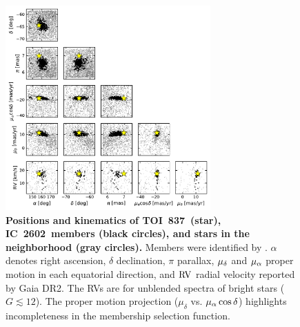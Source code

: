 \documentclass[12pt,twocolumn,tighten]{aastex63}
\newcommand{\tn}{TOI~837} %
\newcommand{\cn}{IC~2602} %
\begin{document}
\begin{figure}[!t]
	\begin{center}
		\leavevmode
		\includegraphics[width=0.7\textwidth]{f8.pdf}
	\end{center}
	\vspace{-0.7cm}
	\caption{ 
  {\bf Positions and kinematics of \tn\ (star), \cn\ members (black
  circles), and stars in the neighborhood (gray circles).} Members
  were identified by \citet{cantatgaudin_gaia_2018}.  $\alpha$ denotes
  right ascension, $\delta$ declination, $\pi$ parallax, $\mu_{\rm
  \delta}$ and $\mu_{\rm \alpha}$ proper motion in each equatorial
  direction, and ${\rm RV}$ radial velocity reported by Gaia DR2.  The
  RVs are for unblended spectra of bright stars ($G\lesssim 12$).  The
  proper motion projection ($\mu_{\delta}$ vs{.} $\mu_{\rm
  \alpha}\cos\delta$) highlights incompleteness in the membership
  selection function.
  \label{fig:full_kinematics}
	}
\end{figure}
\end{document}
